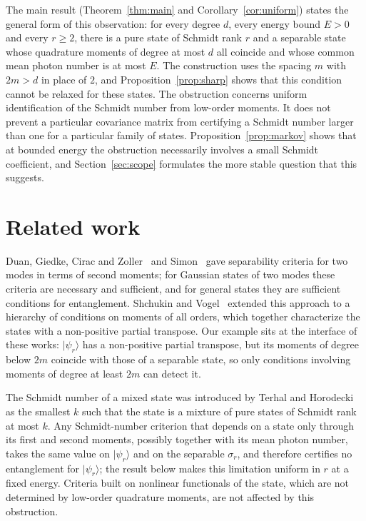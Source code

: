 \documentclass[11pt,a4paper]{article}
\theoremstyle{definition}
\theoremstyle{plain}
\newcommand{\ket}[1]{\lvert#1\rangle}
\begin{document}
The main result (Theorem~\ref{thm:main} and Corollary~\ref{cor:uniform}) states
the general form of this observation: for every degree $d$, every energy bound
$E>0$ and every $r\ge2$, there is a pure state of Schmidt rank $r$ and a
separable state whose quadrature moments of degree at most $d$ all coincide and
whose common mean photon number is at most $E$. The construction uses the
spacing $m$ with $2m>d$ in place of $2$, and Proposition~\ref{prop:sharp}
shows that this condition cannot be relaxed for these states. The obstruction
concerns uniform identification of the Schmidt number from low-order moments.
It does not prevent a particular covariance matrix from certifying a Schmidt
number larger than one for a particular family of states. Proposition~\ref{prop:markov} shows that at
bounded energy the obstruction necessarily involves a small Schmidt
coefficient, and Section~\ref{sec:scope} formulates the more stable question
that this suggests.

\section{Related work}\label{sec:related}
Duan, Giedke, Cirac and Zoller~\cite{Duan2000} and Simon~\cite{Simon2000}
gave separability criteria for two modes in terms of second moments; for
Gaussian states of two modes these criteria are necessary and sufficient, and
for general states they are sufficient conditions for entanglement. Shchukin
and Vogel~\cite{Shchukin2005} extended this approach to a hierarchy of
conditions on moments of all orders, which together characterize the states
with a non-positive partial transpose. Our example sits at the interface of
these works: $\ket{\psi_r}$ has a non-positive partial transpose, but its
moments of degree below $2m$ coincide with those of a separable state, so only
conditions involving moments of degree at least $2m$ can detect it.

The Schmidt number of a mixed state was introduced by Terhal and
Horodecki~\cite{Terhal2000} as the smallest $k$ such that the state is a
mixture of pure states of Schmidt rank at most $k$. Any Schmidt-number
criterion that depends on a state only through its first and second moments,
possibly together with its mean photon number, takes the same value on
$\ket{\psi_r}$ and on the separable $\sigma_r$, and therefore certifies no
entanglement for $\ket{\psi_r}$; the result below makes this limitation
uniform in $r$ at a fixed energy. Criteria built on nonlinear functionals of
the state, which are not determined by low-order quadrature moments, are not
affected by this obstruction.
\end{document}
